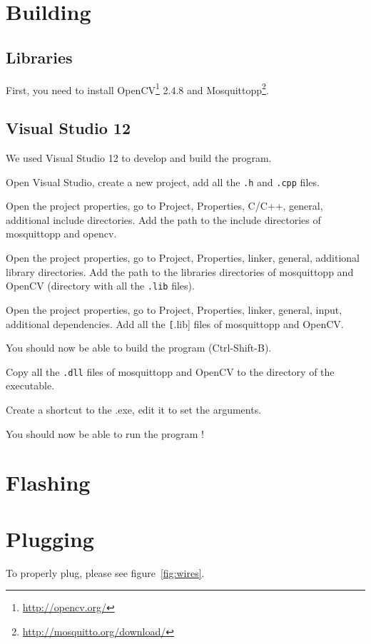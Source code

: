 \documentclass[a4paper,11pt]{report}
\begin{document}
\section{Building}

\subsection{Libraries}

First, you need to install OpenCV\footnote{\url{http://opencv.org/}} 2.4.8 and
Mosquittopp\footnote{\url{http://mosquitto.org/download/}}.

\subsection{Visual Studio 12}

We used Visual Studio 12 to develop and build the program.

Open Visual Studio, create a new project, add all the \texttt{.h} and
\texttt{.cpp} files.

Open the project properties, go to Project, Properties, C/C++, general,
additional include directories. Add the path to the include directories of
mosquittopp and opencv.

Open the project properties, go to Project, Properties, linker, general,
additional library directories. Add the path to the libraries directories of
mosquittopp and OpenCV (directory with all the \texttt{.lib} files).

Open the project properties, go to Project, Properties, linker, general, input,
additional dependencies. Add all the \texttt[.lib] files of mosquittopp and
OpenCV.

You should now be able to build the program (Ctrl-Shift-B).

Copy all the \texttt{.dll} files of mosquittopp and OpenCV to the directory of
the executable.

Create a shortcut to the .exe, edit it to set the arguments.

You should now be able to run the program !

\section{Flashing}
\label{sec:Flashing} %

\section{Plugging}
To properly plug, please see figure~\ref{fig:wires}.
\end{document}
